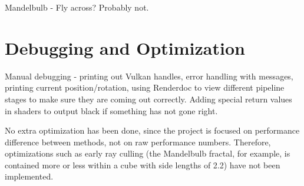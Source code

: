 Mandelbulb - Fly across? Probably not.

\section{Debugging and Optimization}

Manual debugging - printing out Vulkan handles, error handling with messages, printing current position/rotation, using Renderdoc to view different pipeline stages to make sure they are coming out correctly. Adding special return values in shaders to output black if something has not gone right.

No extra optimization has been done, since the project is focused on performance difference between methods, not on raw performance numbers. Therefore, optimizations such as early ray culling (the Mandelbulb fractal, for example, is contained more or less within a cube with side lengths of 2.2) have not been implemented.